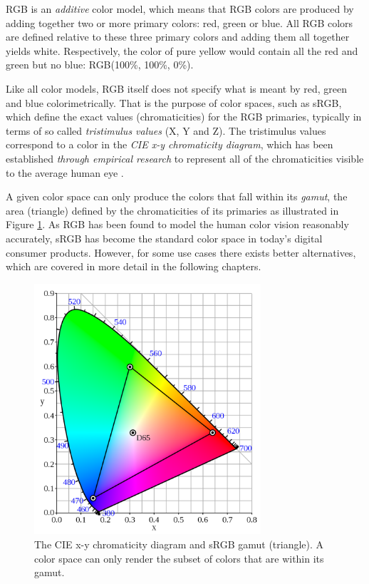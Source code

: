\documentclass[thesis.tex]{subfiles}
\begin{document}
RGB is an \textit{additive} color model, which means that RGB colors are produced by adding together two or more primary colors: red, green or blue. All RGB colors are defined relative to these three primary colors and adding them all together yields white. Respectively, the color of pure yellow would contain all the red and green but no blue: RGB(100\%, 100\%, 0\%).

Like all color models, RGB itself does not specify what is meant by red, green and blue colorimetrically. That is the purpose of color spaces, such as sRGB, which define the exact values (chromaticities) for the RGB primaries, typically in terms of so called \textit{tristimulus values} (X, Y and Z). The tristimulus values correspond to a color in the \textit{CIE x-y chromaticity diagram}, which has been established \emph{through empirical research} to represent all of the chromaticities visible to the average human eye \cite{cie}.

A given color space can only produce the colors that fall within its \textit{gamut}, the area (triangle) defined by the chromaticities of its primaries as illustrated in Figure \ref{figure:srgb}. As RGB has been found to model the human color vision reasonably accurately, sRGB has become the standard color space in today's digital consumer products. However, for some use cases there exists better alternatives, which are covered in more detail in the following chapters.

\begin{figure}[ht]
\vspace{-2mm}
\centering \includegraphics[width=0.75\textwidth]{images/srgb}
\vspace{-2mm}
\caption{The CIE x-y chromaticity diagram and sRGB gamut (triangle). A color space can only render the subset of colors that are within its gamut.\label{figure:srgb}}
\end{figure}
\vspace{-2mm}
\end{document}
